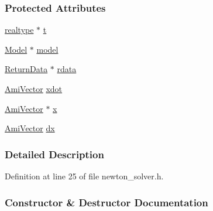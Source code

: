 \subsubsection*{Protected Attributes}
\begin{DoxyCompactItemize}
\item 
\mbox{\hyperlink{namespaceamici_a1bdce28051d6a53868f7ccbf5f2c14a3}{realtype}} $\ast$ \mbox{\hyperlink{classamici_1_1_newton_solver_ad94d61da9b85c1a151ffd8e228758c7c}{t}}
\item 
\mbox{\hyperlink{classamici_1_1_model}{Model}} $\ast$ \mbox{\hyperlink{classamici_1_1_newton_solver_a7b56c3ca57dde73bdbc8dbe9772bca19}{model}}
\item 
\mbox{\hyperlink{classamici_1_1_return_data}{Return\+Data}} $\ast$ \mbox{\hyperlink{classamici_1_1_newton_solver_a4c0807651f0594a186e8856f22e442cc}{rdata}}
\item 
\mbox{\hyperlink{classamici_1_1_ami_vector}{Ami\+Vector}} \mbox{\hyperlink{classamici_1_1_newton_solver_a6329150d913cecfe54dad5fd03214ce8}{xdot}}
\item 
\mbox{\hyperlink{classamici_1_1_ami_vector}{Ami\+Vector}} $\ast$ \mbox{\hyperlink{classamici_1_1_newton_solver_af64268982dd7b9be1690573763982e0b}{x}}
\item 
\mbox{\hyperlink{classamici_1_1_ami_vector}{Ami\+Vector}} \mbox{\hyperlink{classamici_1_1_newton_solver_a17e4770df418fc1f2c4283d7e188d81d}{dx}}
\end{DoxyCompactItemize}


\subsubsection{Detailed Description}


Definition at line 25 of file newton\+\_\+solver.\+h.



\subsubsection{Constructor \& Destructor Documentation}
\mbox{\label{classamici_1_1_newton_solver_ab8ae759b768fe202522ca33df2770be0}} 
